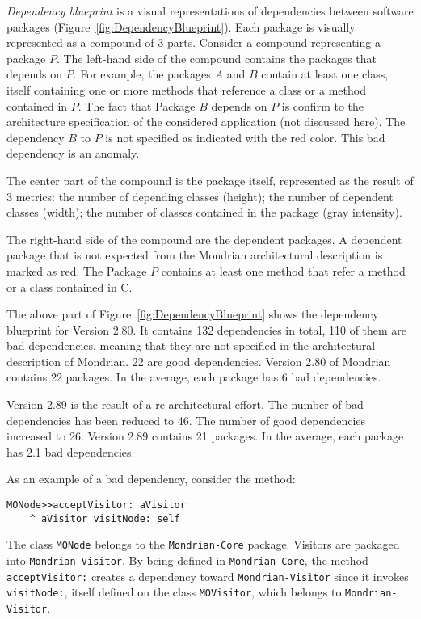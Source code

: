 \documentclass[runningheads]{llncs}
\newcommand{\ct}{\lstinline[backgroundcolor=\color{white},basicstyle=\footnotesize\ttfamily]}
\newcommand{\figref}[1]{Figure~\ref{fig:#1}}
\begin{document}
\emph{Dependency blueprint} is a visual representations of dependencies between software packages (\figref{DependencyBlueprint}). Each package is visually represented as a compound of 3 parts. Consider a compound representing a package $P$. The left-hand side of the compound contains the packages that depends on $P$. For example, the packages $A$ and $B$ contain at least one class, itself containing one or more methods that reference a class or a method contained in $P$. The fact that Package $B$ depends on $P$ is confirm to the architecture specification of the considered application (not discussed here). The dependency $B$ to $P$ is not specified as indicated with the red color. This bad dependency is an anomaly.

The center part of the compound is the package itself, represented as the result of 3 metrics: the number of depending classes (height); the number of dependent classes (width); the number of classes contained in the package (gray intensity). 

The right-hand side of the compound are the dependent packages. A dependent package that is not expected from the Mondrian architectural description is marked as red. The Package $P$ contains at least one method that refer a method or a class contained in C.


The above part of \figref{DependencyBlueprint} shows the dependency blueprint for Version 2.80. It contains 132 dependencies in total, 110 of them are bad dependencies, meaning that they are not specified in the architectural description of Mondrian.  22 are good dependencies. Version 2.80 of Mondrian contains 22 packages. In the average, each package has 6 bad dependencies. 

Version 2.89 is the result of a re-architectural effort. The number of bad dependencies has been reduced to 46. The number of good dependencies increased to 26. Version 2.89 contains 21 packages.  In the average, each package has 2.1 bad dependencies.

As an example of a bad dependency, consider the method:

\begin{lstlisting}
MONode>>acceptVisitor: aVisitor
	^ aVisitor visitNode: self
\end{lstlisting}

The class \ct{MONode} belongs to the \ct{Mondrian-Core} package. Visitors are packaged into \ct{Mondrian-Visitor}. By being defined in \ct{Mondrian-Core}, the method \ct{acceptVisitor:} creates a dependency toward \ct{Mondrian-Visitor} since it invokes \ct{visitNode:}, itself defined on the class \ct{MOVisitor}, which belongs to \ct{Mondrian-Visitor}. 
\end{document}

